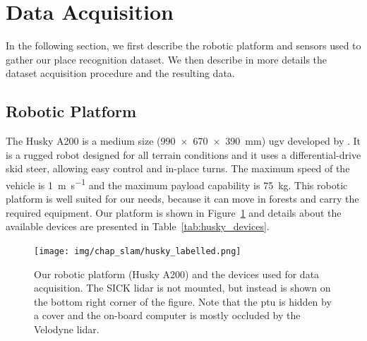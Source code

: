 \section{Data Acquisition}
\label{sec:chap_slam_data_acquisition}

In the following section, we first describe the robotic platform and sensors used to gather our place recognition dataset. We then describe in more details the dataset acquisition procedure and the resulting data.


\subsection{Robotic Platform}
\label{ssec:chap_slam_platform}

The Husky A200 is a medium size (\SI{990 x 670 x 390}{\milli\meter}) \gls*{ugv} developed by \cite{ClearpathWeb}. It is a rugged robot designed for all terrain conditions and it uses a differential-drive skid steer, allowing easy control and in-place turns. The maximum speed of the vehicle is \SI{1}{\meter\per\second} and the maximum payload capability is \SI{75}{\kilo\gram}. This robotic platform is well suited for our needs, because it can move in forests and carry the required equipment. Our platform is shown in Figure~\ref{fig:chap_slam_husky} and details about the available devices are presented in Table~\ref{tab:husky_devices}. 

\begin{figure}[H]
    \centering
    \texttt{[image: img/chap\_slam/husky\_labelled.png]}
    \caption[Our robotic platform (Husky A200) and the devices used for data acquisition.]{Our robotic platform (Husky A200) and the devices used for data acquisition. The SICK \gls*{lidar} is not mounted, but instead is shown on the bottom right corner of the figure. Note that the \gls*{ptu} is hidden by a cover and the on-board computer is mostly occluded by the Velodyne \gls*{lidar}.}
    \label{fig:chap_slam_husky}
\end{figure}

